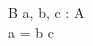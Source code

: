 \begin{zed}
[A]
\end{zed}

\begin{schema}{B}
  a, b, c : \seq A \\
\where
  a = b \cat c \\
\end{schema}
